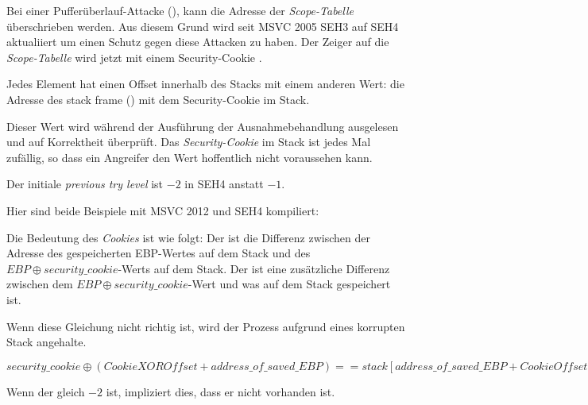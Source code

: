 
\myindex{\BufferOverflow}
Bei einer Pufferüberlauf-Attacke (), kann die Adresse der \emph{Scope-Tabelle}
überschrieben werden. Aus diesem Grund wird seit MSVC 2005 SEH3 auf SEH4 aktualiiert um einen Schutz gegen
diese Attacken zu haben.
Der Zeiger auf die \emph{Scope-Tabelle} wird jetzt mit einem Security-Cookie .

Jedes Element hat einen Offset innerhalb des Stacks mit einem anderen Wert:
die Adresse des \gls{stack frame} (\EBP)  mit dem Security-Cookie im Stack.

Dieser Wert wird während der Ausführung der Ausnahmebehandlung ausgelesen und auf
Korrektheit überprüft.
Das \emph{Security-Cookie} im Stack ist jedes Mal zufällig, so dass ein Angreifer den
Wert hoffentlich nicht voraussehen kann.

Der initiale \emph{previous try level} ist $-2$ in SEH4 anstatt $-1$.

\def\SEHfour{1}


Hier sind beide Beispiele mit MSVC 2012 und SEH4 kompiliert:





Die Bedeutung des \emph{Cookies} ist wie folgt:
Der  ist die Differenz zwischen der Adresse des gespeicherten EBP-Wertes
auf dem Stack und des $EBP \oplus security\_cookie$-Werts auf dem Stack.
Der   ist eine zusätzliche Differenz zwischen dem $EBP \oplus security\_cookie$-Wert
und was auf dem Stack gespeichert ist.

Wenn diese Gleichung nicht richtig ist, wird der Prozess aufgrund eines korrupten Stack angehalte.

\begin{center}
$security\_cookie \oplus (CookieXOROffset + address\_of\_saved\_EBP) == stack[address\_of\_saved\_EBP + CookieOffset]$
\end{center}

Wenn der  gleich $-2$ ist, impliziert dies, dass er nicht vorhanden ist.

\iffalse
\myindex{tracer}
\emph{Cookie}-Überprüfung ist auch in dem \tracer{} implementiert.
Siehe \href{https://github.com/DennisYurichev/tracer/blob/master/SEH.c}{GitHub} für Details.

Es ist immer noch möglich, SEH3 im Compiler zu nutzen wenn eine neuere Version als MSVC 2005
genutzt wird, durch setzen der \TT{/GS-}-Option.
Der \ac{CRT}-Code nutzt SEH4 auf jeden Fall.
\fi

